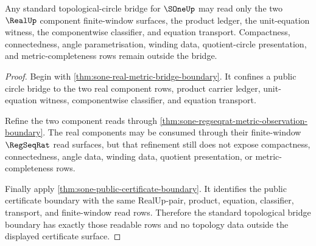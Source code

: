 \begin{theorem}
\label{thm:sone-standard-topological-bridge-boundary}
Any standard topological-circle bridge for $\SOneUp$ may read only the two
$\RealUp$ component finite-window surfaces, the product ledger, the
unit-equation witness, the componentwise classifier, and equation transport.
Compactness, connectedness, angle parametrisation, winding data, quotient-circle
presentation, and metric-completeness rows remain outside the bridge.
\end{theorem}
\begin{proof}
Begin with \autoref{thm:sone-real-metric-bridge-boundary}. It confines a public
circle bridge to the two real component rows, product carrier ledger,
unit-equation witness, componentwise classifier, and equation transport.

Refine the two component reads through
\autoref{thm:sone-regseqrat-metric-observation-boundary}. The real components
may be consumed through their finite-window $\RegSeqRat$ read surfaces, but
that refinement still does not expose compactness, connectedness, angle data,
winding data, quotient presentation, or metric-completeness rows.

Finally apply \autoref{thm:sone-public-certificate-boundary}. It identifies the
public certificate boundary with the same RealUp-pair, product, equation,
classifier, transport, and finite-window read rows. Therefore the standard
topological bridge boundary has exactly those readable rows and no topology
data outside the displayed certificate surface.
\end{proof}

